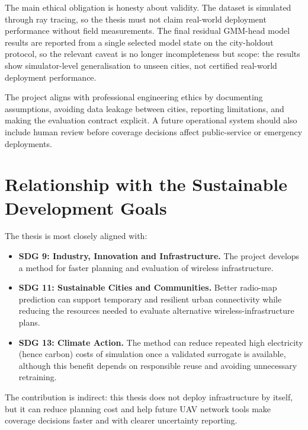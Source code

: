 The main ethical obligation is honesty about validity. The dataset is simulated
through ray tracing, so the thesis must not claim real-world deployment
performance without field measurements. The final residual GMM-head model results are reported
from a single selected model state on the city-holdout protocol, so the relevant
caveat is no longer incompleteness but scope: the results show simulator-level
generalisation to unseen cities, not certified real-world deployment
performance.

The project aligns with professional engineering ethics by documenting
assumptions, avoiding data leakage between cities, reporting limitations, and
making the evaluation contract explicit. A future operational system should
also include human review before coverage decisions affect public-service or
emergency deployments.

\section{Relationship with the Sustainable Development Goals}

The thesis is most closely aligned with:

\begin{itemize}
  \item \textbf{SDG 9: Industry, Innovation and Infrastructure.} The project
  develops a method for faster planning and evaluation of wireless
  infrastructure.
  \item \textbf{SDG 11: Sustainable Cities and Communities.} Better radio-map
  prediction can support temporary and resilient urban connectivity while
  reducing the resources needed to evaluate alternative wireless-infrastructure
  plans.
  \item \textbf{SDG 13: Climate Action.} The method can reduce repeated
  high electricity (hence carbon) costs of simulation once a validated surrogate is available, although this
  benefit depends on responsible reuse and avoiding unnecessary retraining.
\end{itemize}

The contribution is indirect: this thesis does not deploy infrastructure by
itself, but it can reduce planning cost and help future UAV network tools make
coverage decisions faster and with clearer uncertainty reporting.
